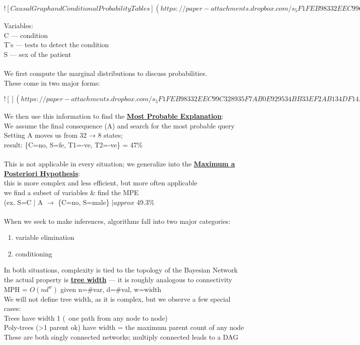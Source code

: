 \documentclass[../../lecture_notes.tex]{subfiles}
\begin{document}
\newpage
$![Causal Graph and Conditional Probability Tables](https://paper-attachments.dropbox.com/s_5F1FEB98332EEC99C328935F7AB0E929534BB33EF2AB134DF14A85072ADC65A0_1590219806142_Screen+Shot+2020-05-23+at+12.43.14+AM.png)$
\newpage

\noindent Variables:\\
	\indent C — condition\\
	\indent T’s — tests to detect the condition\\
	\indent S — sex of the patient\\
\\
We first compute the marginal distributions to discuss probabilities.\\
These come in two major forms:

\newpage
$![](https://paper-attachments.dropbox.com/s_5F1FEB98332EEC99C328935F7AB0E929534BB33EF2AB134DF14A85072ADC65A0_1590220321908_Untitled+drawing+5.jpg)$
\newpage

\noindent We then use this information to find the \textbf{\underline{Most Probable Explanation}}:\\
We assume the final consequence (A) and search for the most probable query\\
	\indent Setting A moves us from 32 → 8 states;\\
	\indent result: \{C=no, S=fe, T1=-ve, T2=-ve\} = 47\%\\
\\
This is not applicable in every situation; we generalize into the \textbf{\underline{Maximum a Posteriori Hypothesis}}:\\
	\indent this is more complex and less efficient, but more often applicable\\
	\indent we find a subset of variables \& find the MPE\\
	\indent (ex. S=C | A $\rightarrow$ \{C=no, S=male\} $|approx$ 49.3\%\\
\\
When we seek to make inferences, algorithms fall into two major categories:
\begin{enumerate} [itemsep=0mm]
	\item variable elimination
	\item conditioning
\end{enumerate} \medskip

\noindent In both situations, complexity is tied to the topology of the Bayesian Network\\
	\indent the actual property is \textbf{\underline{tree width}} — it is roughly analogous to connectivity\\
	\indent MPH = $O(nd^w)$ given n=\#var, d=\#val, w=width\\
We will not define tree width, as it is complex, but we observe a few special cases:\\
	\indent Trees have width 1 (~one path from any node to node)\\
	\indent Poly-trees (>1 parent ok) have width = the maximum parent count of any node\\
These are both singly connected networks; multiply connected leads to a DAG\\
\end{document}
